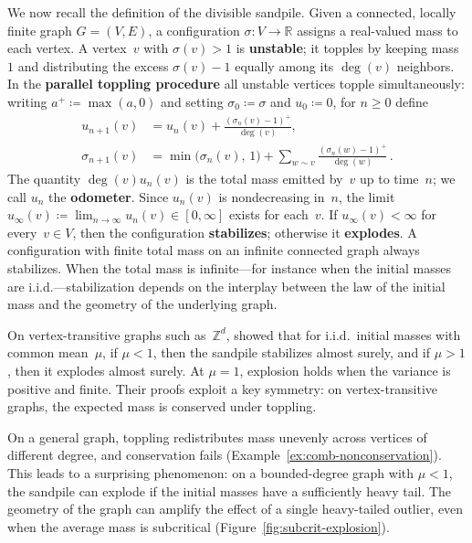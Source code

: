 \documentclass[11pt]{amsart}
\theoremstyle{plain}
\theoremstyle{definition}
\newcommand{\Z}{\mathbb{Z}}
\newcommand{\R}{\mathbb{R}}
\begin{document}
	We now recall the definition of the divisible sandpile. Given a connected, locally finite graph $G=(V,E)$, a configuration $\sigma\colon V \to \R$ assigns a real-valued mass to each vertex. A vertex~$v$ with $\sigma(v)>1$ is \textbf{unstable}; it topples by keeping mass~$1$ and distributing the excess $\sigma(v) - 1$ equally among its $\deg(v)$ neighbors. In the \textbf{parallel toppling procedure} all unstable vertices topple simultaneously: writing $a^+\coloneqq\max(a,0)$ and setting $\sigma_0 \coloneqq \sigma$ and $u_0 \coloneqq 0$, for $n \geq 0$ define
	\begin{align}
		u_{n+1}(v) &= u_n(v) + \frac{(\sigma_n(v) - 1)^+}{\deg(v)}, \label{eq:u-update} \\
		\sigma_{n+1}(v) &= \min\bigl(\sigma_n(v),\,1\bigr) + \sum_{w \sim v} \frac{(\sigma_n(w)-1)^+}{\deg(w)}\,. \label{eq:sigma-update}
	\end{align}
	The quantity $\deg(v) u_n(v)$ is the total mass emitted by~$v$ up to time~$n$; we call $u_n$ the \textbf{odometer}. Since $u_n(v)$ is nondecreasing in~$n$, the limit $u_\infty(v) \coloneqq \lim_{n \to \infty} u_n(v) \in [0, \infty]$ exists for each~$v$.
	If $u_\infty(v) < \infty$ for every~$v \in V$, then the configuration \textbf{stabilizes}; otherwise it \textbf{explodes}. A configuration with finite total mass on an infinite connected graph always stabilizes. When the total mass is infinite---for instance when the initial masses are i.i.d.---stabilization depends on the interplay between the law of the initial mass and the geometry of the underlying graph. 
	
	On vertex-transitive graphs such as~$\Z^d$, \citet*{div-sand-crit} showed that for i.i.d.\ initial masses with common mean~$\mu$, if $\mu<1$, then the sandpile stabilizes almost surely, and if $\mu>1$, then it explodes almost surely. At $\mu=1$, explosion holds when the variance is positive and finite. Their proofs exploit a key symmetry: on vertex-transitive graphs, the expected mass is conserved under toppling.
	
	On a general graph, toppling redistributes mass unevenly across vertices of different degree, and conservation fails (Example~\ref{ex:comb-nonconservation}). This leads to a surprising phenomenon: on a bounded-degree graph with $\mu < 1$, the sandpile can explode if the initial masses have a sufficiently heavy tail. The geometry of the graph can amplify the effect of a single heavy-tailed outlier, even when the average mass is subcritical (Figure~\ref{fig:subcrit-explosion}).
	
\end{document}
